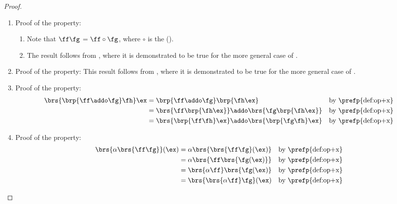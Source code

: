 \begin{proof}
\begin{enumerate}
  \item Proof of the  property:
    \begin{enumerate}
      \item Note that $\ff\fg$ = $\ff\circ\fg$, where $\circ$ is the
             ().
      \item The result follows from , where it is demonstrated to be true for the more 
            general case of .
    \end{enumerate}

  \item Proof of the  property:
        This result follows from , where it is demonstrated to be true for the more 
            general case of .

  \item Proof of the  property: 
    \begin{align*}
      \brs{\brp{\ff\addo\fg}\fh}\ex
        &= \brp{\ff\addo\fg}\brp{\fh\ex} 
        && \text{by \prefp{def:op+x}}
      \\&= \brs{\ff\brp{\fh\ex}}\addo\brs{\fg\brp{\fh\ex}} 
        && \text{by \prefp{def:op+x}}
      \\&= \brs{\brp{\ff\fh}\ex} \addo \brs{\brp{\fg\fh}\ex}
        && \text{by \prefp{def:op+x}}
    \end{align*}

  \item Proof of the  property:
    \begin{align*}
      \brs{\alpha\brs{\ff\fg}}(\ex)
        &= \alpha\brs{\brs{\ff\fg}(\ex)}
        && \text{by \prefp{def:op+x}}
      \\&= \alpha\brs{\ff\brs{\fg(\ex)}}
        && \text{by \prefp{def:op+x}}
      \\&= \brs{\alpha\ff}\brs{\fg(\ex)}
        && \text{by \prefp{def:op+x}}
      \\&= \brs{\brs{\alpha\ff}\fg}(\ex)
        && \text{by \prefp{def:op+x}}
    \end{align*}
\end{enumerate}
\end{proof}

